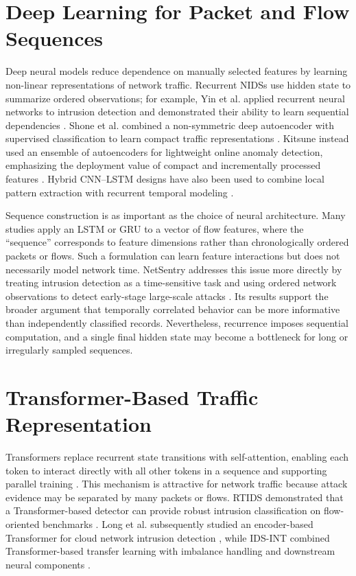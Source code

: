 \documentclass[11pt,fleqn]{report}
\begin{document}
\section{Deep Learning for Packet and Flow Sequences}
\label{subsec:rw_deep_sequences}

Deep neural models reduce dependence on manually selected features by learning non-linear representations of network traffic. Recurrent NIDSs use hidden state to summarize ordered observations; for example, Yin et al. applied recurrent neural networks to intrusion detection and demonstrated their ability to learn sequential dependencies \cite{Yin2017RNNIDS}. Shone et al. combined a non-symmetric deep autoencoder with supervised classification to learn compact traffic representations \cite{Shone2018NNAE}. Kitsune instead used an ensemble of autoencoders for lightweight online anomaly detection, emphasizing the deployment value of compact and incrementally processed features \cite{Mirsky2018Kitsune}. Hybrid CNN--LSTM designs have also been used to combine local pattern extraction with recurrent temporal modeling \cite{Ullah2024IDSINT}.

Sequence construction is as important as the choice of neural architecture. Many studies apply an LSTM or GRU to a vector of flow features, where the ``sequence'' corresponds to feature dimensions rather than chronologically ordered packets or flows. Such a formulation can learn feature interactions but does not necessarily model network time. NetSentry addresses this issue more
directly by treating intrusion detection as a time-sensitive task and using ordered network observations to detect early-stage large-scale attacks \cite{LiuPatras2022NetSentry}. Its results support the broader argument that temporally correlated behavior can be more informative than independently classified records. Nevertheless, recurrence imposes sequential computation, and a single final hidden state may become a bottleneck for long or irregularly sampled sequences.

\section{Transformer-Based Traffic Representation}
\label{subsec:rw_transformers}

Transformers replace recurrent state transitions with self-attention, enabling each token to interact directly with all other tokens in a sequence and supporting parallel training \cite{Vaswani2017}. This mechanism is attractive for network traffic because attack evidence may be separated by many packets or flows. RTIDS demonstrated that a Transformer-based detector can provide robust intrusion classification on flow-oriented benchmarks \cite{Wu2022RTIDS}. Long et al. subsequently studied an encoder-based Transformer for cloud network intrusion detection
\cite{Long2024TransformerNIDS}, while IDS-INT combined Transformer-based transfer learning with imbalance handling and downstream neural components \cite{Ullah2024IDSINT}.
\end{document}
